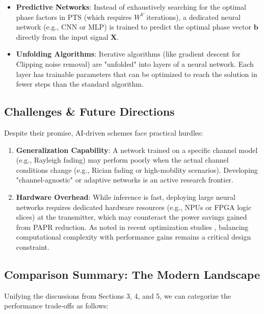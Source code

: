 \documentclass[12pt, a4paper, onecolumn]{article}
\begin{document}
\begin{itemize}
    \item \textbf{Predictive Networks}: Instead of exhaustively searching for the optimal phase factors in PTS (which requires $W^V$ iterations), a dedicated neural network (e.g., CNN or MLP) is trained to predict the optimal phase vector $\mathbf{b}$ directly from the input signal $\mathbf{X}$.
    \item \textbf{Unfolding Algorithms}: Iterative algorithms (like gradient descent for Clipping noise removal) are "unfolded" into layers of a neural network. Each layer has trainable parameters that can be optimized to reach the solution in fewer steps than the standard algorithm.
\end{itemize}

\subsection{Challenges \& Future Directions}
Despite their promise, AI-driven schemes face practical hurdles:

\begin{enumerate}
    \item \textbf{Generalization Capability}: A network trained on a specific channel model (e.g., Rayleigh fading) may perform poorly when the actual channel conditions change (e.g., Rician fading or high-mobility scenarios). Developing "channel-agnostic" or adaptive networks is an active research frontier.
    \item \textbf{Hardware Overhead}: While inference is fast, deploying large neural networks requires dedicated hardware resources (e.g., NPUs or FPGA logic slices) at the transmitter, which may counteract the power savings gained from PAPR reduction. As noted in recent optimization studies \cite{ref4}, balancing computational complexity with performance gains remains a critical design constraint.
\end{enumerate}

\subsection{Comparison Summary: The Modern Landscape}
Unifying the discussions from Sections 3, 4, and 5, we can categorize the performance trade-offs as follows:
\end{document}
